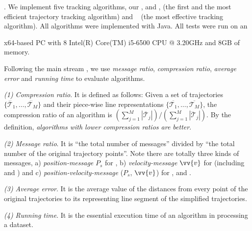 .
We implement five tracking algorithms, \ie our \citt, \sitt and \bitt, \ldrh \cite{Trajcevski:LDRH} (the first and the most efficient trajectory tracking algorithm) and \grts~\cite{Lange:GRTS,Lange:Tracking} (the most effective tracking algorithm).
All algorithms were implemented with Java.
All tests were run on an {x64-based  PC with 8 Intel(R) Core(TM) i5-6500 CPU @ 3.20GHz and 8GB of memory.
	
Following the main stream \cite{Trajcevski:LDRH, Lange:GRTS, Lange:Tracking, Lin:Cised, Zhang:Evaluation}, we use \emph{message ratio}, \emph{compression ratio}, \emph{average error} and \emph{running time} to evaluate algorithms.

 \ni \emph{(1) Compression ratio}. {It is defined as follows: Given a set of trajectories $\{\dddot{\mathcal{T}_1}, \ldots, \dddot{\mathcal{T}_M}\}$ and their piece-wise line representations $\{\overline{\mathcal{T}_1}, \ldots, \overline{\mathcal{T}_M}\}$, the compression ratio of an algorithm is $(\sum_{j=1}^{M} |\overline{\mathcal{T}}_j |)/(\sum_{j=1}^{M} |\dddot{\mathcal{T}}_j |)$.
	By the definition, \emph{algorithms with lower compression ratios are better}.}

 \ni \emph{(2) Message ratio}. It is ``the total number of messages'' divided by ``the total number of the original trajectory points''. Note there are totally three kinds of messages, \ie a) \emph{position-message} $P_s$ for \grts, b) \emph{velocity-message} $\vv{v}$ for \bitt (including \citt and \sitt) and c) \emph{position-velocity-message} ($P_s$, $\vv{v}$) for \ldrh, \grts and \bitt. 
 

 \ni \emph{(3) Average error}. It is the average value of the distances from every point of the original trajectories to its representing line segment of the simplified trajectories.
 
 \ni \emph{(4) Running time}. It is the essential execution time of an algorithm in processing a dataset.
 



}
